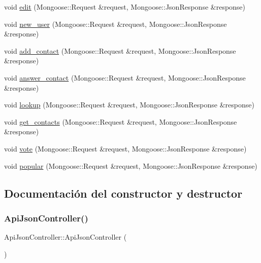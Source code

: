 \begin{DoxyCompactItemize}
void \hyperlink{classApiJsonController_aaac98bdb7d1dc373db45f81cde5a2ba1}{edit} (Mongoose\+::\+Request \&request, Mongoose\+::\+Json\+Response \&response)
\item 
void \hyperlink{classApiJsonController_a56784a6400512fb7d2cdf499b7f60005}{new\+\_\+user} (Mongoose\+::\+Request \&request, Mongoose\+::\+Json\+Response \&response)
\item 
void \hyperlink{classApiJsonController_ae4c1ff09c9e16db375ea371086b45e5b}{add\+\_\+contact} (Mongoose\+::\+Request \&request, Mongoose\+::\+Json\+Response \&response)
\item 
void \hyperlink{classApiJsonController_aa68f90e0aa81f847afbfb55764eac073}{answer\+\_\+contact} (Mongoose\+::\+Request \&request, Mongoose\+::\+Json\+Response \&response)
\item 
void \hyperlink{classApiJsonController_aa9906398a092a9a617dd4833175c6eba}{lookup} (Mongoose\+::\+Request \&request, Mongoose\+::\+Json\+Response \&response)
\item 
void \hyperlink{classApiJsonController_a3a645ef96c3d0d3c8876c8b7b7d05ea6}{get\+\_\+contacts} (Mongoose\+::\+Request \&request, Mongoose\+::\+Json\+Response \&response)
\item 
void \hyperlink{classApiJsonController_a8c00cd6f8f88d05d1e1c80040bcdb1be}{vote} (Mongoose\+::\+Request \&request, Mongoose\+::\+Json\+Response \&response)
\item 
void \hyperlink{classApiJsonController_a4e50d9443193207e630b91bdf5e14e7e}{popular} (Mongoose\+::\+Request \&request, Mongoose\+::\+Json\+Response \&response)
\end{DoxyCompactItemize}


\subsection{Documentación del constructor y destructor}
\mbox{\label{classApiJsonController_ad5d1aff126905ea4a9cc85d481e747a0}} 
\subsubsection{\texorpdfstring{Api\+Json\+Controller()}{ApiJsonController()}}
{\footnotesize\ttfamily Api\+Json\+Controller\+::\+Api\+Json\+Controller (\begin{DoxyParamCaption}{ }\end{DoxyParamCaption})}

